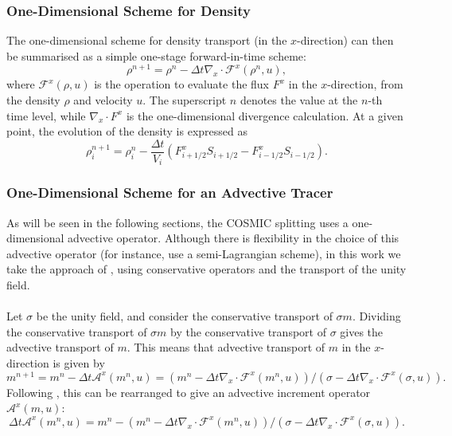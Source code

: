 \documentclass[11pt,a4paper]{article}
\begin{document}
\subsubsection{One-Dimensional Scheme for Density} \label{sec:1d_density}
The one-dimensional scheme for density transport (in the $x$-direction) can then be summarised as a simple one-stage forward-in-time scheme:
\begin{equation}
\rho^{n+1} = \rho^n - \Delta t \nabla_x\cdot \mathcal{F}^x(\rho^n,u),
\end{equation}
where $\mathcal{F}^x(\rho,u)$ is the operation to evaluate the flux $F^x$ in the $x$-direction, from the density $\rho$ and velocity $u$.
The superscript $n$ denotes the value at the $n$-th time level, while $\nabla_x\cdot F^x$ is the one-dimensional divergence calculation.
At a given point, the evolution of the density is expressed as
\begin{equation}
\rho_i^{n+1} = \rho^n_i - \frac{\Delta t}{V_i} \left(F^x_{i+1/2}S_{i+1/2} - F^x_{i-1/2}S_{i-1/2}\right).\end{equation}


\subsubsection{One-Dimensional Scheme for an Advective Tracer} \label{sec:1d_advect}

As will be seen in the following sections, the COSMIC splitting uses a one-dimensional advective operator.
Although there is flexibility in the choice of this advective operator (for instance, \citet{lin1996ffsl} use a semi-Lagrangian scheme), in this work we take the approach of \citet{putman2007fvtransport}, using conservative operators and the transport of the unity field. \\
\\
Let $\sigma$ be the unity field, and consider the conservative transport of $\sigma m$.
Dividing the conservative transport of $\sigma m$ by the conservative transport of $\sigma$ gives the advective transport of $m$.
This means that advective transport of $m$ in the $x$-direction is given by
\begin{equation} \label{eqn:one_d_advection_tracer_2}
m^{n+1} = m^{n} - \Delta{t} \mathcal{A}^x(m^n,u) = \left( m^n - \Delta{t} \nabla_x\cdot \mathcal{F}^x(m^n,u)\right)/\left( \sigma - \Delta{t} \nabla_x\cdot \mathcal{F}^x(\sigma,u)\right).
\end{equation}
Following \citet{putman2007fvtransport}, this can be rearranged to give an advective increment operator $\mathcal{A}^x(m,u)$:
\begin{equation}
    \Delta{t} \mathcal{A}^x(m^n, u) = m^n - \left( m^n - \Delta{t} \nabla_x\cdot \mathcal{F}^x(m^n,u)\right)/\left( \sigma - \Delta{t} \nabla_x\cdot \mathcal{F}^x(\sigma,u)\right).
\end{equation} \\
\end{document}
